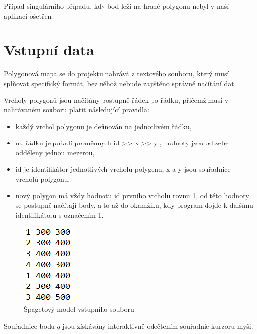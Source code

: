 \documentclass[11pt]{article}
\begin{document}
Případ singulárního případu, kdy bod leží na hraně polygonu nebyl v naší aplikaci ošetřen.

\clearpage





\section{Vstupní data}

Polygonová mapa se do projektu nahrává z textového souboru, který musí splňovat specifický formát, bez něhož nebude zajištěno správné načítání dat.  

Vrcholy polygonů jsou načítány postupně řádek po řádku, přičemž musí v nahrávaném souboru platit následující pravidla:    

\begin{itemize}
\item každý vrchol polygonu je definován na jednotlivém řádku,
\item na řádku je pořadí proměnných id >> x >> y   ,  hodnoty jsou od sebe odděleny  jednou mezerou,
\item id je identifikátor jednotlivých vrcholů polygonu, x a y jsou souřadnice vrcholů polygonu,    
\item nový polygon má vždy hodnotu id prvního vrcholu rovnu 1, od této hodnoty  se  postupně načítají body, a  to až do okamžiku,  kdy program dojde  k dalšímu identifikátoru s označením 1.   
\end{itemize}

\begin{figure}[htbh]
	\centering
	\includegraphics[scale=1]{images/vstup.png} 
	\caption{Špagetový model vstupního souboru}
	\label{fig:vstup.}
\end{figure} 

Souřadnice bodu $q$ jsou získávány interaktivně odečtením souřadnic kurzoru myši.   
\end{document}

